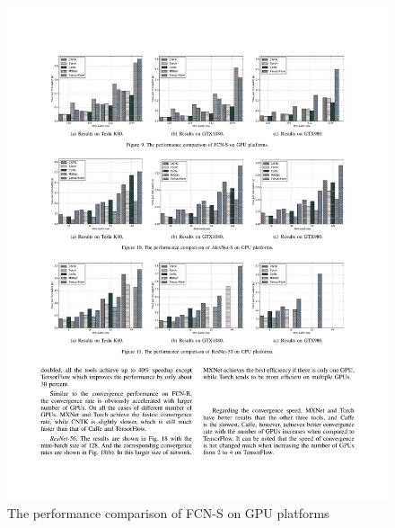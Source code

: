 \documentclass[11pt, oneside]{article}   	%
\begin{document}
\begin{figure}[htbp] 
	\includegraphics[width=\linewidth]{figures/FCN-S2.pdf} 
	\caption{The performance comparison of FCN-S on GPU platforms}
\end{figure}
%
\end{document}
